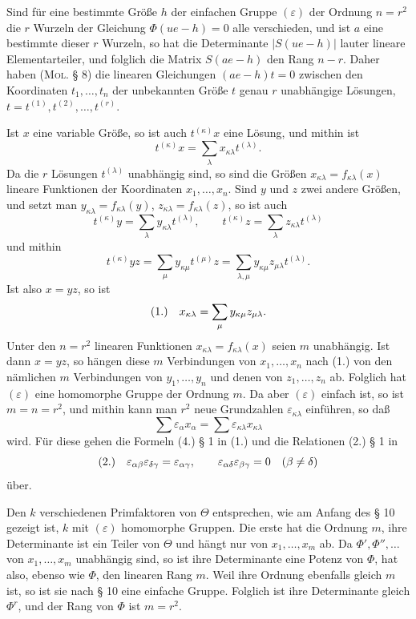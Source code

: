 \documentclass[11pt]{article}
\newcommand{\eps}{\varepsilon}
\newcommand{\fnum}[1]{\textup{(\ensuremath{#1}.)}\quad}
\begin{document}
Sind für eine bestimmte Größe $h$ der einfachen Gruppe $(\eps)$ der Ordnung $n=r^2$ die $r$ Wurzeln der Gleichung $\Phi(ue-h)=0$ alle verschieden, und ist $a$ eine bestimmte dieser $r$ Wurzeln, so hat die Determinante $|S(ue-h)|$ lauter lineare Elementarteiler, und folglich die Matrix $S(ae-h)$ den Rang $n-r$. Daher haben (\textsc{Mol}. § 8) die linearen Gleichungen $(ae-h)t=0$ zwischen den Koordinaten $t_1,\ldots,t_n$ der unbekannten Größe $t$ genau $r$ unabhängige Lösungen, $t=t^{(1)},t^{(2)},\ldots,t^{(r)}$.

Ist $x$ eine variable Größe, so ist auch $t^{(\kappa)}x$ eine Lösung, und mithin ist
\[
 t^{(\kappa)}x=\sum_\lambda x_{\kappa\lambda}t^{(\lambda)}.
\]
Da die $r$ Lösungen $t^{(\lambda)}$ unabhängig sind, so sind die Größen $x_{\kappa\lambda}=f_{\kappa\lambda}(x)$ lineare Funktionen der Koordinaten $x_1,\ldots,x_n$. Sind $y$ und $z$ zwei andere Größen, und setzt man $y_{\kappa\lambda}=f_{\kappa\lambda}(y)$, $z_{\kappa\lambda}=f_{\kappa\lambda}(z)$, so ist auch
\[
 t^{(\kappa)}y=\sum_\lambda y_{\kappa\lambda}t^{(\lambda)},\qquad
 t^{(\kappa)}z=\sum_\lambda z_{\kappa\lambda}t^{(\lambda)}
\]
und mithin
\[
 t^{(\kappa)}yz=\sum_\mu y_{\kappa\mu}t^{(\mu)}z
 =\sum_{\lambda,\mu}y_{\kappa\mu}z_{\mu\lambda}t^{(\lambda)}.
\]
Ist also $x=yz$, so ist
\[
\fnum{1} x_{\kappa\lambda}=\sum_\mu y_{\kappa\mu}z_{\mu\lambda}.
\]
Unter den $n=r^2$ linearen Funktionen $x_{\kappa\lambda}=f_{\kappa\lambda}(x)$ seien $m$ unabhängig. Ist dann $x=yz$, so hängen diese $m$ Verbindungen von $x_1,\ldots,x_n$ nach (1.) von den nämlichen $m$ Verbindungen von $y_1,\ldots,y_n$ und denen von $z_1,\ldots,z_n$ ab. Folglich hat $(\eps)$ eine homomorphe Gruppe der Ordnung $m$. Da aber $(\eps)$ einfach ist, so ist $m=n=r^2$, und mithin kann man $r^2$ neue Grundzahlen $\eps_{\kappa\lambda}$ einführen, so daß
\[
 \sum \eps_\alpha x_\alpha=\sum \eps_{\kappa\lambda}x_{\kappa\lambda}
\]
wird. Für diese gehen die Formeln (4.) § 1 in (1.) und die Relationen (2.) § 1 in
\[
\fnum{2} \eps_{\alpha\beta}\eps_{\delta\gamma}=\eps_{\alpha\gamma},
\qquad
\eps_{\alpha\delta}\eps_{\beta\gamma}=0\quad(\beta\ne\delta)
\]
über.

Den $k$ verschiedenen Primfaktoren von $\Theta$ entsprechen, wie am Anfang des § 10 gezeigt ist, $k$ mit $(\eps)$ homomorphe Gruppen. Die erste hat die Ordnung $m$, ihre Determinante ist ein Teiler von $\Theta$ und hängt nur von $x_1,\ldots,x_m$ ab. Da $\Phi',\Phi'',\ldots$ von $x_1,\ldots,x_m$ unabhängig sind, so ist ihre Determinante eine Potenz von $\Phi$, hat also, ebenso wie $\Phi$, den linearen Rang $m$. Weil ihre Ordnung ebenfalls gleich $m$ ist, so ist sie nach § 10 eine einfache Gruppe. Folglich ist ihre Determinante gleich $\Phi^r$, und der Rang von $\Phi$ ist $m=r^2$.
\end{document}

